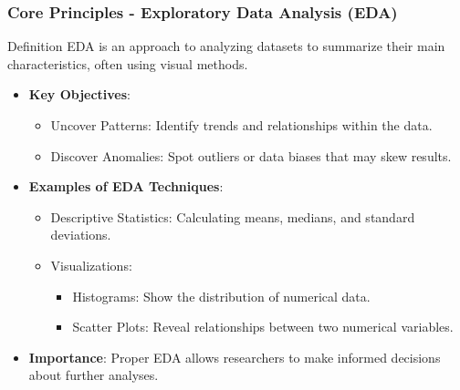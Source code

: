\documentclass{beamer}
\begin{document}
\begin{frame}[fragile]
    \frametitle{Core Principles - Exploratory Data Analysis (EDA)}
    \begin{block}{Definition}
        EDA is an approach to analyzing datasets to summarize their main characteristics, often using visual methods.
    \end{block}
    \begin{itemize}
        \item \textbf{Key Objectives}:
        \begin{itemize}
            \item Uncover Patterns: Identify trends and relationships within the data.
            \item Discover Anomalies: Spot outliers or data biases that may skew results.
        \end{itemize}
        \item \textbf{Examples of EDA Techniques}:
        \begin{itemize}
            \item Descriptive Statistics: Calculating means, medians, and standard deviations.
            \item Visualizations:
            \begin{itemize}
                \item Histograms: Show the distribution of numerical data.
                \item Scatter Plots: Reveal relationships between two numerical variables.
            \end{itemize}
        \end{itemize}
        \item \textbf{Importance}: Proper EDA allows researchers to make informed decisions about further analyses.
    \end{itemize}
\end{frame}
\end{document}
